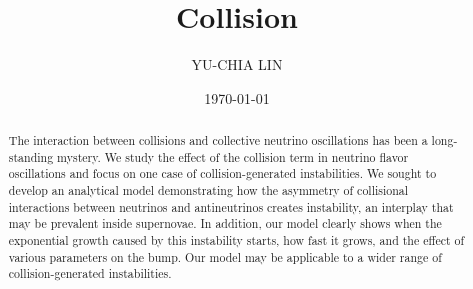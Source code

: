 \documentclass[aps,prd,twocolumn,amsmath,amssymb,groupedaddress]{revtex4-2}
\begin{document}

\title{Collision}


\author{YU-CHIA LIN}

\date{\today}

\begin{abstract}
The interaction between collisions and collective neutrino oscillations has been a long-standing mystery. We study the effect of the collision term in neutrino flavor oscillations and focus on one case of collision-generated instabilities.
We sought to develop an analytical model demonstrating how the asymmetry of collisional interactions between neutrinos and antineutrinos creates instability, an interplay that may be prevalent inside supernovae. 
In addition, our model clearly shows when the exponential growth caused by this instability starts, how fast it grows, and the effect of various parameters on the bump.
Our model may be applicable to a wider range of collision-generated instabilities.
\end{abstract}
\end{document}
